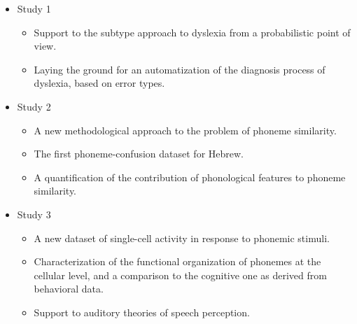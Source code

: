 \begin{itemize}
   \item  Study 1
   \begin{itemize}
        \item  Support to the subtype approach to dyslexia from a probabilistic point of view.
        \item Laying the ground for an automatization of the diagnosis process of dyslexia, based on error types.
    \end{itemize}
   
    \item  Study 2
    \begin{itemize}
        \item A new methodological approach to the problem of phoneme similarity.
        \item The first phoneme-confusion dataset for Hebrew.
        \item A quantification of the contribution of phonological features to phoneme similarity.
   \end{itemize}
   
   \item Study 3
   \begin{itemize}
        \item A new dataset of single-cell activity in response to phonemic stimuli.
        \item Characterization of the functional organization of phonemes at the cellular level, and a comparison to the cognitive one as derived from behavioral data.
        \item Support to auditory theories of speech perception.
   \end{itemize}
\end{itemize}